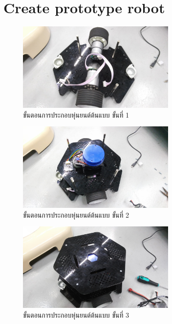 \documentclass{classes/fiboreport}
\begin{document}
\section{Create prototype robot}
\begin{figure}[!ht]
	\centering
	\includegraphics[width=0.7\textwidth]{images/robot_ass1.jpg}
	\caption{ขั้นตอนการประกอบหุ่นยนต์ต้นแบบ ขั้นที่ 1}
	\label{fig:robot_ass1}
\end{figure}

\begin{figure}[!ht]
	\centering
	\includegraphics[width=0.7\textwidth]{images/robot_ass2.jpg}
	\caption{ขั้นตอนการประกอบหุ่นยนต์ต้นแบบ ขั้นที่ 2}
	\label{fig:robot_ass2}
\end{figure}

\begin{figure}[!ht]
	\centering
	\includegraphics[width=0.7\textwidth]{images/robot_ass3.jpg}
	\caption{ขั้นตอนการประกอบหุ่นยนต์ต้นแบบ ขั้นที่ 3}
	\label{fig:robot_ass3}
\end{figure}
\end{document}
